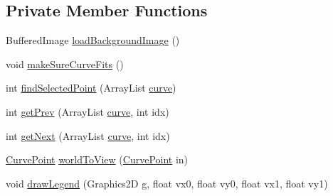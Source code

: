 \subsection*{Private Member Functions}
\begin{DoxyCompactItemize}
\item 
Buffered\+Image \mbox{\hyperlink{classorg_1_1newdawn_1_1slick_1_1tools_1_1peditor_1_1_graph_editor_window_1_1_graph_panel_a0a618208e96ff3832ef090bf9b38843a}{load\+Background\+Image}} ()
\item 
void \mbox{\hyperlink{classorg_1_1newdawn_1_1slick_1_1tools_1_1peditor_1_1_graph_editor_window_1_1_graph_panel_a2ab79793bdbd974974d49ffa163a6e95}{make\+Sure\+Curve\+Fits}} ()
\item 
int \mbox{\hyperlink{classorg_1_1newdawn_1_1slick_1_1tools_1_1peditor_1_1_graph_editor_window_1_1_graph_panel_a2ee8945599065e76bdd24f74ccb7935b}{find\+Selected\+Point}} (Array\+List \mbox{\hyperlink{classorg_1_1newdawn_1_1slick_1_1tools_1_1peditor_1_1_graph_editor_window_1_1_graph_panel_ac95a7a77b5e8460041f157c02e19d2bb}{curve}})
\item 
int \mbox{\hyperlink{classorg_1_1newdawn_1_1slick_1_1tools_1_1peditor_1_1_graph_editor_window_1_1_graph_panel_a4c94c9af840a0b38446fcf8752521555}{get\+Prev}} (Array\+List \mbox{\hyperlink{classorg_1_1newdawn_1_1slick_1_1tools_1_1peditor_1_1_graph_editor_window_1_1_graph_panel_ac95a7a77b5e8460041f157c02e19d2bb}{curve}}, int idx)
\item 
int \mbox{\hyperlink{classorg_1_1newdawn_1_1slick_1_1tools_1_1peditor_1_1_graph_editor_window_1_1_graph_panel_a3017c8b8502a530904b07e1b8711a096}{get\+Next}} (Array\+List \mbox{\hyperlink{classorg_1_1newdawn_1_1slick_1_1tools_1_1peditor_1_1_graph_editor_window_1_1_graph_panel_ac95a7a77b5e8460041f157c02e19d2bb}{curve}}, int idx)
\item 
\mbox{\hyperlink{classorg_1_1newdawn_1_1slick_1_1tools_1_1peditor_1_1_graph_editor_window_1_1_graph_panel_1_1_curve_point}{Curve\+Point}} \mbox{\hyperlink{classorg_1_1newdawn_1_1slick_1_1tools_1_1peditor_1_1_graph_editor_window_1_1_graph_panel_ad3566d27680ba06c4b6c40fdb2c7fbdf}{world\+To\+View}} (\mbox{\hyperlink{classorg_1_1newdawn_1_1slick_1_1tools_1_1peditor_1_1_graph_editor_window_1_1_graph_panel_1_1_curve_point}{Curve\+Point}} in)
\item 
void \mbox{\hyperlink{classorg_1_1newdawn_1_1slick_1_1tools_1_1peditor_1_1_graph_editor_window_1_1_graph_panel_a2a9f1fed09672a66de8e72ddc83baad0}{draw\+Legend}} (Graphics2D g, float vx0, float vy0, float vx1, float vy1)

\end{DoxyCompactItemize}
